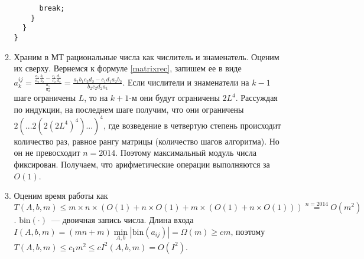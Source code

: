 \documentclass[a4paper]{article}
\begin{document}
\begin{enumerate}
\begin{enumerate}
\begin{lstlisting}
      break;
    }
  }
}
\end{lstlisting}
\item Храним в МТ рациональные числа как числитель и знаменатель. Оценим их сверху. Вернемся к формуле \ref{matrixrec}, запишем ее в виде $a_k^{ij}=\frac{\frac{a_1}{a_2}\frac{b_1}{b_2}-\frac{c_1}{c_2}\frac{d_1}{d_2}}{\frac{a_1}{a_2}}=\frac{a_1b_1c_2d_2-c_1d_1a_2b_2}{b_2c_2d_2a_1}$. Если числители и знаменатели на $k-1$ шаге ограничены $L$, то на $k+1$-м они будут ограничены $2L^4$. Рассуждая по индукции, на последнем шаге получим, что они ограничены $2(...2(2(2L^4)^4)...)^4$, где возведение в четвертую степень происходит количество раз, равное рангу матрицы (количество шагов алгоритма). Но он не превосходит $n=2014$. Поэтому максимальный модуль числа фиксирован. Получаем, что арифметические операции выполняются за $O(1)$.
\item Оценим время работы как $T(A,b,m)\leqslant m\times n\times (O(1) + n \times O(1) + m \times (O(1) + n \times O(1)))\overset{n=2014}{=}O(m^2)$. $\mbox{bin}(\cdot)$~--- двоичная запись числа. Длина входа $I(A,b,m)=(mn+m)\min\limits_{A,b}|\mbox{bin}(a_{ij})|=\Omega(m)\geqslant cm$, поэтому $T(A,b,m)\leqslant c_1m^2\leqslant cI^2(A,b,m)=O(I^2)$.
\end{enumerate}
\newpage

\end{enumerate}
\end{document}
